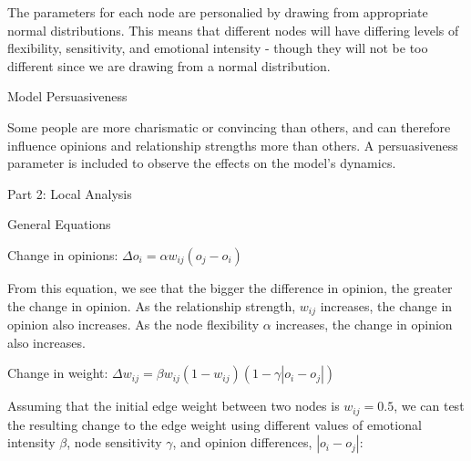 \documentclass[11pt]{article}
\begin{document}
The parameters for each node are personalied by drawing from appropriate
normal distributions. This means that different nodes will have
differing levels of flexibility, sensitivity, and emotional intensity -
though they will not be too different since we are drawing from a normal
distribution.

Model Persuasiveness

Some people are more charismatic or convincing than others, and can
therefore influence opinions and relationship strengths more than
others. A persuasiveness parameter is included to observe the effects on
the model's dynamics.

    Part 2: Local Analysis

General Equations

Change in opinions: \(\Delta o_i = \alpha w_{ij}(o_j - o_i)\)

From this equation, we see that the bigger the difference in opinion,
the greater the change in opinion. As the relationship strength,
\(w_{ij}\) increases, the change in opinion also increases. As the node
flexibility \(\alpha\) increases, the change in opinion also increases.

Change in weight:
\(\Delta w_{ij} = \beta w_{ij}(1-w_{ij})(1-\gamma |o_i-o_j|)\)

Assuming that the initial edge weight between two nodes is
\(w_{ij}=0.5\), we can test the resulting change to the edge weight
using different values of emotional intensity \(\beta\), node
sensitivity \(\gamma\), and opinion differences, \(|o_i - o_j|\):
\end{document}
